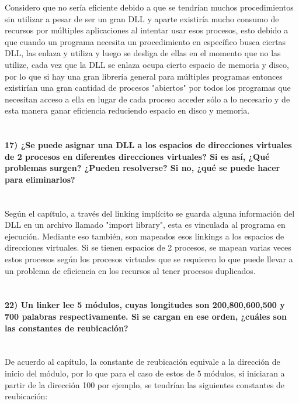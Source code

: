 \documentclass[a4paper,12pt]{article}
\begin{document}
	Considero que no sería eficiente debido a que se tendrían muchos procedimientos sin utilizar a pesar de ser un gran DLL y aparte existiría mucho consumo de recursos por múltiples aplicaciones al intentar usar esos procesos, esto debido a que cuando un programa necesita un procedimiento en específico busca ciertas DLL, las enlaza y utiliza y luego se desliga de ellas en el momento que no las utilize, cada vez que la DLL se enlaza ocupa cierto espacio de memoria y disco, por lo que si hay una gran librería general para múltiples programas entonces existirían una gran cantidad de procesos "abiertos" por todos los programas que necesitan acceso a ella en lugar de cada proceso acceder sólo a lo necesario y de esta manera ganar eficiencia reduciendo espacio en disco y memoria.
	
	\paragraph{\\17) ¿Se puede asignar una DLL a los espacios de direcciones virtuales de 2 procesos en diferentes direcciones virtuales? Si es así, ¿Qué problemas surgen? ¿Pueden resolverse? Si no, ¿qué se puede hacer para eliminarlos?\\\\}

	Según el capítulo, a través del linking implícito se guarda alguna información del DLL en un archivo llamado "import library", esta es vinculada al programa en ejecución. Mediante eso también, son mapeados esos linkings a los espacios de direcciones virtuales. Si se tienen espacios de 2 procesos, se mapean varias veces estos procesos según los procesos virtuales que se requieren lo que puede llevar a un problema de eficiencia en los recursos al tener procesos duplicados.
	

	\paragraph{\\22) Un linker lee 5 módulos, cuyas longitudes son 200,800,600,500 y 700 palabras respectivamente. Si se cargan en ese orden, ¿cuáles son las constantes de reubicación? \\\\}

	De acuerdo al capítulo, la constante de reubicación equivale a la dirección de inicio del módulo, por lo que para el caso de estos de 5 módulos, si iniciaran a partir de la dirección 100 por ejemplo, se tendrían las siguientes constantes de reubicación:\\
\end{document}
